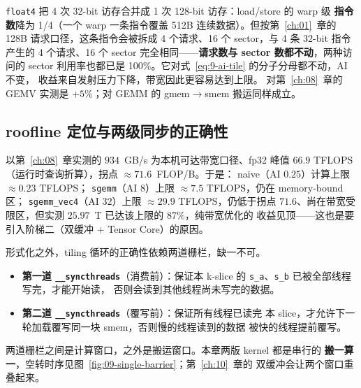 \texttt{float4} 把 4 次 32-bit 访存合并成 1 次 128-bit 访存：load/store 的 warp 级
\textbf{指令数}降为 1/4（一个 warp 一条指令覆盖 512B 连续数据）。但按第~\ref{ch:01}~章的
128B 请求口径，这条指令会被拆成 4 个请求、16 个 sector，与 4 条 32-bit 指令产生的
4 个请求、16 个 sector 完全相同——\textbf{请求数与 sector 数都不动}，两种访问的
sector 利用率也都已是 100\%。它对式~\ref{eq:9-ai-tile} 的分子分母都不动，AI 不变，
收益来自发射压力下降，带宽因此更容易达到上限。
对第~\ref{ch:08}~章的 GEMV 实测是 $+5\%$；对 GEMM 的 gmem$\to$smem 搬运同样成立。

\subsection{roofline 定位与两级同步的正确性}

以第~\ref{ch:08}~章实测的 $934$~GB/s 为本机可达带宽口径、fp32 峰值 $66.9$ TFLOPS
（运行时查询折算），拐点 $\approx 71.6$~FLOP/B。于是：
naive（AI $0.25$）计算上限 $\approx 0.23$ TFLOPS；
\texttt{sgemm}（AI $8$）上限 $\approx 7.5$ TFLOPS，仍在 memory-bound 区；
\texttt{sgemm\_vec4}（AI $32$）上限 $\approx 29.9$ TFLOPS，仍低于拐点
$71.6$、尚在带宽受限区，但实测 $25.97$~T 已达该上限的 $87\%$，纯带宽优化的
收益见顶——这也是要引入阶梯二（双缓冲 + Tensor Core）的原因。

形式化之外，tiling 循环的正确性依赖两道栅栏，缺一不可。
\begin{itemize}
  \item \textbf{第一道 \texttt{\_\allowbreak{}\_\allowbreak{}syncthreads}}（消费前）：保证本 k-slice 的
        \texttt{s\_a}、\texttt{s\_b} 已被全部线程写完，才能开始读，
        否则会读到其他线程尚未写完的数据。
  \item \textbf{第二道 \texttt{\_\allowbreak{}\_\allowbreak{}syncthreads}}（覆写前）：保证所有线程已读完
        本 slice，才允许下一轮加载覆写同一块 smem，否则慢的线程读到的数据
        被快的线程提前覆写。
\end{itemize}

两道栅栏之间是计算窗口，之外是搬运窗口。本章两版 kernel 都是串行的
\textbf{搬一算一}，空转时序见图~\ref{fig:09-single-barrier}；第~\ref{ch:10}~章的
双缓冲会让两个窗口重叠起来。


